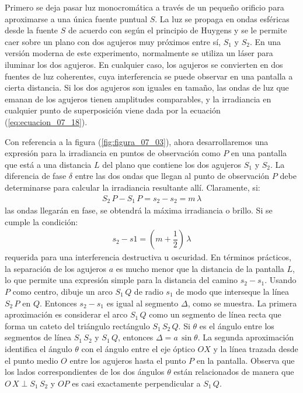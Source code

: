 \documentclass[14pt]{extarticle}
\begin{document}
Primero se deja pasar luz monocromática a través de un pequeño orificio para aproximarse a una única fuente puntual $S$. La luz se propaga en ondas esféricas desde la fuente $S$ de acuerdo con según el principio de Huygens y se le permite caer sobre un plano con dos agujeros muy próximos entre sí, $S_{1}$ y $S_{2}$. En una versión moderna de este experimento, normalmente se utiliza un láser para iluminar los dos agujeros. En cualquier caso, los agujeros se convierten en dos fuentes de luz coherentes, cuya interferencia se puede observar en una pantalla a cierta distancia. Si los dos agujeros son iguales en tamaño, las ondas de luz que emanan de los agujeros tienen amplitudes comparables, y la irradiancia en cualquier punto de superposición viene dada por la ecuación (\ref{eq:ecuacion_07_18}).
\par
Con referencia a la figura (\ref{fig:figura_07_03}), ahora desarrollaremos una expresión para la irradiancia en puntos de observación como $P$ en una pantalla que está a una distancia $L$ del plano que contiene los dos agujeros $S_{1}$ y $S_{2}$. La diferencia de fase $\delta$ entre las dos ondas que llegan al punto de observación $P$ debe determinarse para calcular la irradiancia resultante allí. Claramente, si:
\begin{align*}
S_{2} \, P - S_{1} \, P = s_{2} - s_{2} = m \, \lambda
\end{align*}
las ondas llegarán en fase, se obtendrá la máxima irradiancia o brillo. Si se cumple la condición:
\begin{align*}
s_{2} - s{1} = \left( m + \dfrac{1}{2} \right) \, \lambda
\end{align*}
requerida para una interferencia destructiva u oscuridad. En términos prácticos, la separación de los agujeros $a$ es mucho menor que la distancia de la pantalla $L$, lo que permite una expresión simple para la distancia del camino $s_{2} - s_{1}$. Usando $P$ como centro, dibuje un arco $S_{1} \, Q$ de radio $s_{1}$ de modo que interseque la línea $S_{2} \, P$ en $Q$. Entonces $s_{2} - s_{1}$ es igual al segmento $\Delta$, como se muestra. La primera aproximación es considerar el arco $S_{1} \, Q$ como un segmento de línea recta que forma un cateto del triángulo rectángulo $S_{1} \, S_{2} \,Q$. Si $\theta$ es el ángulo entre los segmentos de línea $S_{1} \, S_{2}$ y $S_{1} \, Q$, entonces $\Delta = a \, \sin \theta$. La segunda aproximación identifica el ángulo $\theta$ con el ángulo entre el eje óptico $OX$ y la línea trazada desde el punto medio $O$ entre los agujeros hasta el punto $P$ en la pantalla. Observa que los lados correspondientes de los dos ángulos $\theta$ están relacionados de manera que $O \, X \perp S_{1} \, S_{2}$ y $OP$ es casi exactamente perpendicular a $S_{1} \, Q$.
\end{document}
